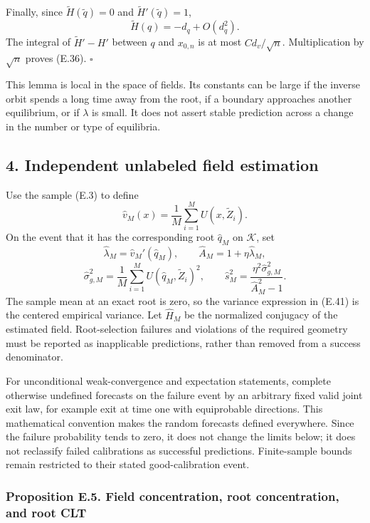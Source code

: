 Finally, since \(\widetilde H(\widetilde q)=0\) and
\(\widetilde H'(\widetilde q)=1\), \[
\widetilde H(q)=-d_q+O(d_q^2).
\] The integral of \(\widetilde H'-H'\) between \(q\) and \(x_{0,n}\) is
at most \(C d_v/\sqrt n\). Multiplication by \(\sqrt n\) proves (E.36).
\(\square\)

This lemma is local in the space of fields. Its constants can be large
if the inverse orbit spends a long time away from the root, if a
boundary approaches another equilibrium, or if \(\lambda\) is small. It
does not assert stable prediction across a change in the number or type
of equilibria.

\subsection{4. Independent unlabeled field
estimation}\label{calibration-independent-unlabeled-field-estimation}

Use the sample (E.3) to define \[
\widehat v_M(x)=\frac1M\sum_{i=1}^M U(x,\widetilde Z_i).
\tag{E.40}
\] On the event that it has the corresponding root \(\widehat q_M\) on
\(\mathcal K\), set \[
\widehat\lambda_M=\widehat v_M'(\widehat q_M),\qquad
\widehat A_M=1+\eta\widehat\lambda_M,
\] \[
\widehat\sigma_{g,M}^2
=\frac1M\sum_{i=1}^M U(\widehat q_M,\widetilde Z_i)^2,
\qquad
\widehat s_M^2
=\frac{\eta^2\widehat\sigma_{g,M}^2}{\widehat A_M^2-1}.
\tag{E.41}
\] The sample mean at an exact root is zero, so the variance expression
in (E.41) is the centered empirical variance. Let \(\widehat H_M\) be
the normalized conjugacy of the estimated field. Root-selection failures
and violations of the required geometry must be reported as inapplicable
predictions, rather than removed from a success denominator.

For unconditional weak-convergence and expectation statements, complete
otherwise undefined forecasts on the failure event by an arbitrary fixed
valid joint exit law, for example exit at time one with equiprobable
directions. This mathematical convention makes the random forecasts
defined everywhere. Since the failure probability tends to zero, it does
not change the limits below; it does not reclassify failed calibrations
as successful predictions. Finite-sample bounds remain restricted to
their stated good-calibration event.

\subsubsection{Proposition E.5. Field concentration, root concentration,
and root
CLT}\label{calibration-proposition-e.5.-field-concentration-root-concentration-and-root-clt}

